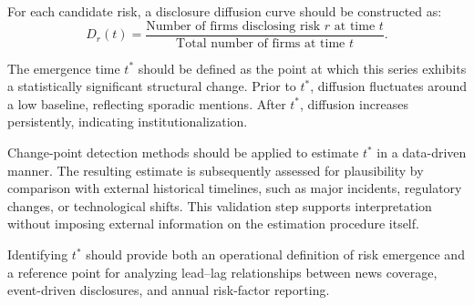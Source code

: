 \documentclass[11pt,a4paper]{article}
\begin{document}
For each candidate risk, a disclosure diffusion curve should be constructed as:
$$
D_r(t) = \frac{\text{Number of firms disclosing risk } r \text{ at time } t}{\text{Total number of firms at time } t}.
$$

The emergence time $t^*$ should be defined as the point at which this series exhibits a statistically significant structural change. Prior to $t^*$, diffusion fluctuates around a low baseline, reflecting sporadic mentions. After $t^*$, diffusion increases persistently, indicating institutionalization.

Change-point detection methods should be applied to estimate $t^*$ in a data-driven manner. The resulting estimate is subsequently assessed for plausibility by comparison with external historical timelines, such as major incidents, regulatory changes, or technological shifts. This validation step supports interpretation without imposing external information on the estimation procedure itself.

Identifying $t^*$ should provide both an operational definition of risk emergence and a reference point for analyzing lead--lag relationships between news coverage, event-driven disclosures, and annual risk-factor reporting.
\end{document}
